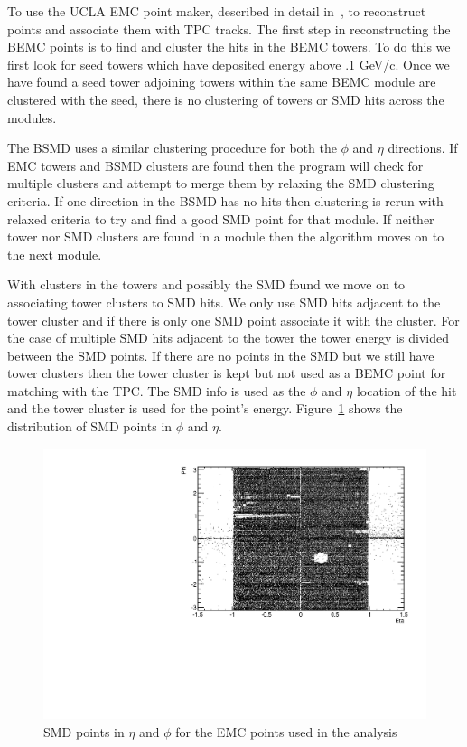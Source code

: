 To use the UCLA EMC point maker, described in detail in~\cite{dongthesis}, to reconstruct points and associate them with TPC tracks. The first step in reconstructing the BEMC points is to find and cluster the hits in the BEMC towers. To do this we first look for seed towers which have deposited energy above .1 GeV/c. Once we have found a seed tower adjoining towers within the same BEMC module are clustered with the seed, there is no clustering of towers or SMD hits across the modules. 

The BSMD uses a similar clustering procedure for both the $\phi$ and $\eta$ directions. If EMC towers and BSMD clusters are found then the program will check for multiple clusters and attempt to merge them by relaxing the SMD clustering criteria. If one direction in the BSMD has no hits then clustering is rerun with relaxed criteria to try and find a good SMD point for that module. If neither tower nor SMD clusters are found in a module then the algorithm moves on to the next module. 

With clusters in the towers and possibly the SMD found we move on to associating tower clusters to SMD hits. We only use SMD hits adjacent to the tower cluster and if there is only one SMD point associate it with the cluster. For the case of multiple SMD hits adjacent to the tower the tower energy is divided between the SMD points. If there are no points in the SMD but we still have tower clusters then the tower cluster is kept but not used as a BEMC point for matching with the TPC. The SMD info is used as the $\phi$ and $\eta$ location of the hit and the tower cluster is used for the point's energy. Figure~\ref{fig:SMDetaphi} shows the distribution of SMD points in $\phi$ and $\eta$.

\begin{figure}[htbp]
\begin{center}
\includegraphics[scale=.75]{Plots/NPE/SMD_phi_eta.pdf}
\end{center}
\caption[SMD Point $\eta$ and $\phi$]{SMD points in $\eta$ and $\phi$ for the EMC points used in the analysis}
\label{fig:SMDetaphi}
\end{figure}

